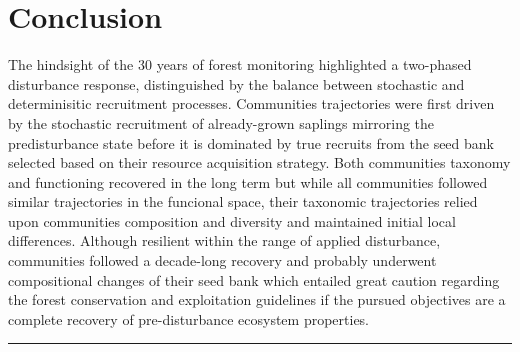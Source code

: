 \documentclass[fleqn,10pt]{ArtEcoFoG} %
\begin{document}
\section{Conclusion}\label{conclusion}

The hindsight of the 30 years of forest monitoring highlighted a
two-phased disturbance response, distinguished by the balance between
stochastic and determinisitic recruitment processes. Communities
trajectories were first driven by the stochastic recruitment of
already-grown saplings mirroring the predisturbance state before it is
dominated by true recruits from the seed bank selected based on their
resource acquisition strategy. Both communities taxonomy and functioning
recovered in the long term but while all communities followed similar
trajectories in the funcional space, their taxonomic trajectories relied
upon communities composition and diversity and maintained initial local
differences. Although resilient within the range of applied disturbance,
communities followed a decade-long recovery and probably underwent
compositional changes of their seed bank which entailed great caution
regarding the forest conservation and exploitation guidelines if the
pursued objectives are a complete recovery of pre-disturbance ecosystem
properties.

\begin{center}\rule{0.5\linewidth}{\linethickness}\end{center}



\makeatletter

\makeatother


\end{document}
